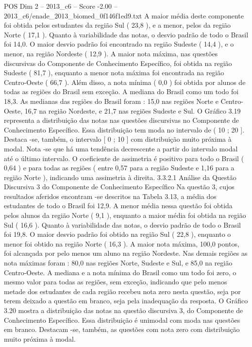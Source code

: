 \begin{textsample}{POS Dim 2 – 2013\_c6 – Score -2.00 – 2013\_c6/enade\_2013\_biomed\_0f146f1ed9.txt}
A maior média deste componente foi obtida pelos estudantes da região Sul ( 23,8 ), e a menor, pelos da região Norte ( 17,1 ).
Quanto à variabilidade das notas, o desvio padrão de todo o Brasil foi 14,0.
O maior desvio padrão foi encontrado na região Sudeste ( 14,4 ), e o menor, na região Nordeste ( 12,9 ).
A maior nota máxima, nas questões discursivas do Componente de Conhecimento Específico, foi obtida na região Sudeste ( 81,7 ), enquanto a menor nota máxima foi encontrada na região Centro-Oeste ( 66,7 ).
Além disso, a nota mínima ( 0,0 ) foi obtida por alunos de todas as regiões do Brasil sem exceção.
A mediana do Brasil como um todo foi 18,3.
As medianas das regiões do Brasil foram : 15,0 nas regiões Norte e Centro-Oeste, 16,7 na região Nordeste, e 21,7 nas regiões Sudeste e Sul.
O Gráfico 3.19 representa a distribuição das notas nas questões discursivas no Componente de Conhecimento Específico.
Essa distribuição tem moda no intervalo de ( 10 ; 20 ].
Destaca -se, também, o intervalo [ 0 ; 10 ] com distribuição muito próxima à modal.
Nota -se que há uma tendência decrescente a partir do intervalo modal até o último intervalo.
O coeficiente de assimetria é positivo para todo o Brasil ( 0,64 ) e para todas as regiões ( entre 0,57 para a região Sudeste e 1,16 para a região Norte ), indicando uma assimetria à direita. 3.3.2.1 Análise da Questão Discursiva 3 do Componente de Conhecimento Específico Na questão 3, cujos resultados aferidos encontram -se descritos na Tabela 3.13, a média dos estudantes de todo o Brasil foi 12,9.
A menor média nessa questão foi obtida pelos alunos da região Norte ( 9,1 ), enquanto a maior média foi obtida na região Sul ( 16,6 ).
Quanto à variabilidade das notas, o desvio padrão de todo o Brasil foi 19,8.
O maior desvio padrão foi obtido na região Sul ( 22,8 ), enquanto o menor foi obtido na região Norte ( 16,3 ).
A maior nota máxima, 100,0 pontos, foi alcançada por pelo menos um aluno na região Nordeste.
Nas demais regiões as nota máximas foram : 80,0 nas regiões Norte, Sudeste e Sul, e 85,0 na região Centro-Oeste.
A mediana e a nota mínima do Brasil como um todo foi zero, o mesmo valor para todas as regiões, sem exceção, indicando que pelo menos metade dos estudantes de cada região recebeu nota zero nesta questão, seja por terem deixado a questão em branco, seja pela inadequação da resposta.
O Gráfico 3.20 mostra a distribuição das notas na questão discursiva 3, do Componente de Conhecimento Específico.
Essa distribuição é unimodal com moda nas questões em branco.
Destacam -se, também, as questões com nota zero com distribuição muito próxima à modal.

\end{textsample}
